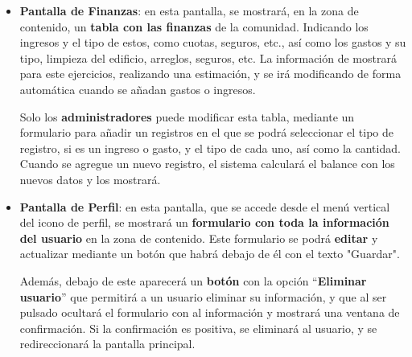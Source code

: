 \begin{appendices}
\begin{itemize}
	\item \textbf{Pantalla de Finanzas}: en esta pantalla, se mostrará, en la zona de contenido, un \textbf{tabla con las finanzas} de la comunidad. Indicando los ingresos y el tipo de estos, como cuotas, seguros, etc., así como los gastos y su tipo, limpieza del edificio, arreglos, seguros, etc. La información de mostrará para este ejercicios, realizando una estimación, y se irá modificando de forma automática cuando se añadan gastos o ingresos. 
	
	Solo los \textbf{administradores} puede modificar esta tabla, mediante un formulario para añadir un registros en el que se podrá seleccionar el tipo de registro, si es un ingreso o gasto, y el tipo de cada uno, así como la cantidad. Cuando se agregue un nuevo registro, el sistema calculará el balance con los nuevos datos y los mostrará.
	
	\item \textbf{Pantalla de Perfil}: en esta pantalla, que se accede desde el menú vertical del icono de perfil, se mostrará un \textbf{formulario con toda la información del usuario} en la zona de contenido. Este formulario se podrá \textbf{editar} y actualizar mediante un botón que habrá debajo de él con el texto "Guardar". 
	
	Además, debajo de este aparecerá un \textbf{botón} con la opción ``\textbf{Eliminar usuario}'' que permitirá a un usuario eliminar su información, y que al ser pulsado ocultará el formulario con al información y mostrará una ventana de confirmación. Si la confirmación es positiva, se eliminará al usuario, y se redireccionará la pantalla principal.
\end{itemize}


\end{appendices}

\newpage

\printglossary	

\newpage




